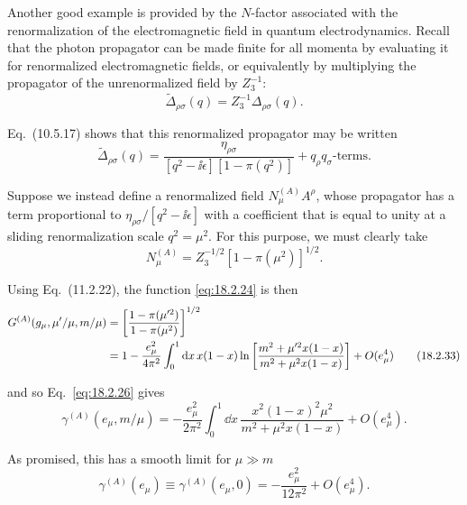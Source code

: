 Another good example is provided by the $N$-factor associated with the
renormalization of the electromagnetic field in quantum electrodynamics.
Recall that the photon propagator can be made finite for all momenta by
evaluating it for renormalized electromagnetic fields, or equivalently by
multiplying the propagator of the unrenormalized field by $Z_3^{-1}$:
\begin{equation}
\widetilde\Delta_{\rho\sigma}(q)=Z_3^{-1}\Delta_{\rho\sigma}(q).
\tag{18.2.30}\label{eq:18.2.30}
\end{equation}
\par\noindent
Eq.~(10.5.17) shows that this renormalized propagator may be written
\begin{equation}
\widetilde\Delta_{\rho\sigma}(q)
=\frac{\eta_{\rho\sigma}}{[q^2-\ii\epsilon][1-\pi(q^2)]}
+q_\rho q_\sigma\text{-terms}.
\tag{18.2.31}\label{eq:18.2.31}
\end{equation}
\par\noindent
Suppose we instead define a renormalized field $N_\mu^{(A)}A^\rho$, whose
propagator has a term proportional to $\eta_{\rho\sigma}/[q^2-\ii\epsilon]$
with a coefficient that is equal to unity at a sliding renormalization scale
$q^2=\mu^2$. For this purpose, we must clearly take
\begin{equation}
N_\mu^{(A)}=Z_3^{-1/2}[1-\pi(\mu^2)]^{1/2}.
\tag{18.2.32}\label{eq:18.2.32}
\end{equation}
\par\noindent
Using Eq.~(11.2.22), the function \eqref{eq:18.2.24} is then
\begin{align}
G^{(A)}(g_\mu,\mu'/\mu,m/\mu)
&=\left[\frac{1-\pi(\mu'^2)}{1-\pi(\mu^2)}\right]^{1/2}\notag\\
&=1-\frac{e_\mu^2}{4\pi^2}\int_0^1\mathop{}\!\mathrm{d} x\,x(1-x)
\ln\left[\frac{m^2+\mu'^2x(1-x)}{m^2+\mu^2x(1-x)}\right]
+O(e_\mu^4)
\tag{18.2.33}\label{eq:18.2.33}
\end{align}
\par\noindent
and so Eq.~\eqref{eq:18.2.26} gives
\begin{equation}
\gamma^{(A)}(e_\mu,m/\mu)
=-\frac{e_\mu^2}{2\pi^2}\int_0^1\dd x\,
\frac{x^2(1-x)^2\mu^2}{m^2+\mu^2x(1-x)}+O(e_\mu^4).
\tag{18.2.34}\label{eq:18.2.34}
\end{equation}
\par\noindent
As promised, this has a smooth limit for $\mu\gg m$
\begin{equation}
\gamma^{(A)}(e_\mu)\equiv\gamma^{(A)}(e_\mu,0)
=-\frac{e_\mu^2}{12\pi^2}+O(e_\mu^4).
\tag{18.2.35}\label{eq:18.2.35}
\end{equation}
\par\noindent

